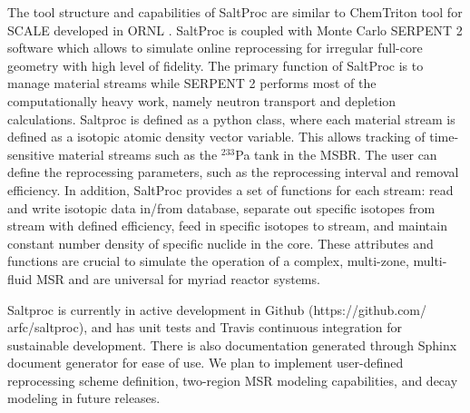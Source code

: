 The tool structure and capabilities of SaltProc are similar to ChemTriton tool for SCALE
developed in \gls{ORNL} \cite{powers_new_2013}. SaltProc is coupled with Monte Carlo SERPENT 2
software which allows to simulate online reprocessing for irregular full-core geometry with 
high level of fidelity.  The primary function of SaltProc is to manage material streams while
SERPENT 2 performs most of the computationally heavy work, namely neutron transport and depletion
calculations. Saltproc is defined as a 
python class, where each material stream is defined as a isotopic atomic density
vector variable. This allows tracking of time-sensitive material streams such as the
$^{233}$Pa tank in the \gls{MSBR}. The user can define the reprocessing parameters, such as the 
reprocessing interval and removal efficiency.  In addition, SaltProc provides a set of functions 
for each stream: read and write isotopic data in/from database, separate out specific isotopes 
from stream with defined efficiency, feed in specific isotopes to stream, and maintain constant 
number density of specific nuclide in the core. These attributes and functions are crucial to 
simulate the operation of a complex, multi-zone, multi-fluid \gls{MSR} and are universal for 
myriad reactor systems.

Saltproc is currently in active development in Github (https://github.com/ arfc/saltproc), and has unit tests and Travis continuous integration for sustainable development. There is also documentation
generated through Sphinx document generator for ease of use. We plan to implement
user-defined reprocessing scheme definition, two-region \gls{MSR} modeling capabilities,
and decay modeling in future releases.

